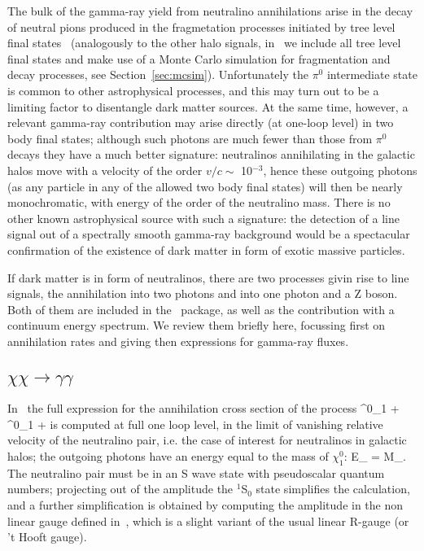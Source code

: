 The bulk of the gamma-ray yield from neutralino annihilations arise in the
decay of neutral pions produced in the fragmetation processes initiated
by tree level final states~\cite{oldcontga,lpj,gahalo}
(analogously to the other halo signals,
in \ds\ we include all tree level final states and make use of a
Monte Carlo simulation for fragmentation and decay processes, see 
Section~\ref{sec:mcsim}). Unfortunately the $\pi^0$ 
intermediate state is common to other astrophysical processes, and this
may turn out to be a limiting factor to disentangle dark matter sources.
At the same time, however, a relevant gamma-ray contribution may arise 
directly (at one-loop level) in two body final states; although such 
photons are much fewer than those from $\pi^0$ decays they have a much 
better signature: neutralinos annihilating in the galactic halos move 
with a velocity of the order $v/c \sim$ 10$^{-3}$, hence these outgoing 
photons (as any particle in any of the allowed two body final states)
will then be nearly monochromatic, with energy of the order of the
neutralino mass\cite{charm,oldlines,jkline,lp,ub,lpj}. 
There is no other known astrophysical source with such a signature:
the detection of a line signal out of a spectrally smooth gamma-ray 
background would be a spectacular confirmation of the existence of dark 
matter in form of exotic massive particles.

If dark matter is in form of neutralinos, there are two processes
givin rise to line signals, the annihilation into two photons and into
one photon and a Z boson. Both of them are included in the \ds\ 
package, as well as the contribution with a continuum energy spectrum.
We review them briefly here, focussing first on annihilation rates
and giving then expressions for gamma-ray fluxes.


\subsection{$\chi\chi\to \gamma\gamma$}

In \ds\ the full expression for the annihilation cross section of
the process
\beq
\tilde{\chi}^{0}_{1} + \tilde{\chi}^{0}_{1} \rightarrow \gamma
+\gamma
\eeq
is computed at full one loop level, in the limit of vanishing relative 
velocity of the neutralino pair, i.e. the case of interest for neutralinos
in galactic halos; the outgoing photons have an energy equal to 
the mass of ${\chi}^{0}_{1}$:
\beq
E_{\gamma} = M_{\chi}.
\eeq
The neutralino pair must be in an S wave state with pseudoscalar quantum 
numbers; projecting out of the amplitude the $^{1}$S$_{0}$ state
simplifies the calculation, and a further simplification is obtained by
computing the amplitude in the non linear gauge defined in~\cite{fujikawa}, 
which is a slight variant of the usual linear R-gauge (or 't Hooft gauge). 

